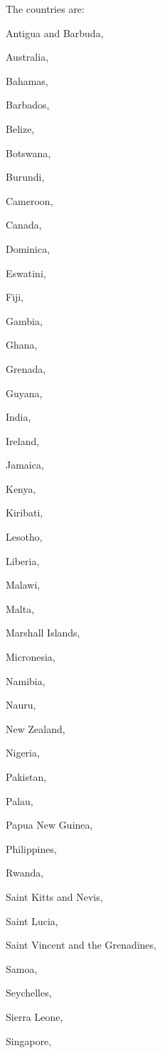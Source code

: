The countries are: 
\begin{enumerate*}[label=(\arabic*)]
\item {Antigua and Barbuda},
\item {Australia},
\item Bahamas,
\item Barbados,
\item {Belize},
\item {Botswana},
\item {Burundi},
\item {Cameroon},
\item {Canada},
\item Dominica,
\item {Eswatini},
\item {Fiji},
\item {Gambia},
\item {Ghana},
\item {Grenada},
\item {Guyana},
\item {India},
\item {Ireland},
\item {Jamaica},
\item {Kenya},
\item Kiribati,
\item {Lesotho},
\item {Liberia},
\item {Malawi},
\item {Malta},
\item Marshall Islands,
\item Micronesia,
\item {Namibia},
\item Nauru,
\item {New Zealand},
\item {Nigeria},
\item {Pakistan},
\item Palau,
\item {Papua New Guinea},
\item {Philippines},
\item {Rwanda},
\item {Saint Kitts and Nevis},
\item Saint Lucia,
\item Saint Vincent and the Grenadines,
\item Samoa,
\item {Seychelles},
\item {Sierra Leone},
\item {Singapore},

\end{enumerate*}
